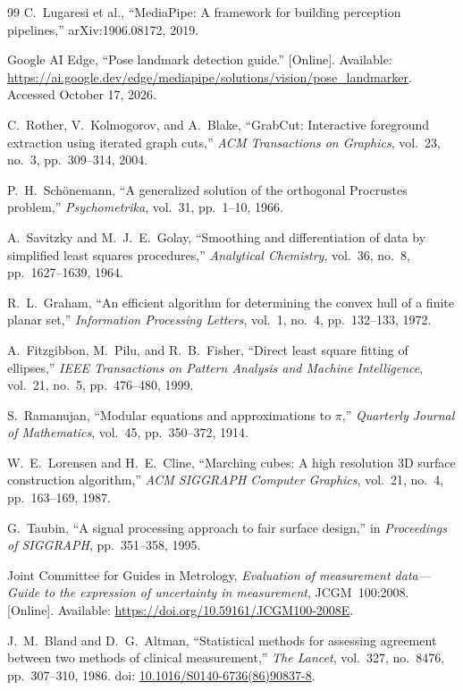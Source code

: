 \documentclass[11pt,a4paper]{article}
\numberwithin{equation}{section}
\begin{document}
\begin{thebibliography}{99}
C.~Lugaresi et al., ``MediaPipe: A framework for building perception pipelines,'' arXiv:1906.08172, 2019.

Google AI Edge, ``Pose landmark detection guide.'' [Online]. Available: \url{https://ai.google.dev/edge/mediapipe/solutions/vision/pose_landmarker}. Accessed October 17, 2026.

C.~Rother, V.~Kolmogorov, and A.~Blake, ``GrabCut: Interactive foreground extraction using iterated graph cuts,'' \emph{ACM Transactions on Graphics}, vol.~23, no.~3, pp.~309--314, 2004.

P.~H.~Sch\"onemann, ``A generalized solution of the orthogonal Procrustes problem,'' \emph{Psychometrika}, vol.~31, pp.~1--10, 1966.

A.~Savitzky and M.~J.~E.~Golay, ``Smoothing and differentiation of data by simplified least squares procedures,'' \emph{Analytical Chemistry}, vol.~36, no.~8, pp.~1627--1639, 1964.

R.~L.~Graham, ``An efficient algorithm for determining the convex hull of a finite planar set,'' \emph{Information Processing Letters}, vol.~1, no.~4, pp.~132--133, 1972.

A.~Fitzgibbon, M.~Pilu, and R.~B.~Fisher, ``Direct least square fitting of ellipses,'' \emph{IEEE Transactions on Pattern Analysis and Machine Intelligence}, vol.~21, no.~5, pp.~476--480, 1999.

S.~Ramanujan, ``Modular equations and approximations to $\pi$,'' \emph{Quarterly Journal of Mathematics}, vol.~45, pp.~350--372, 1914.

W.~E.~Lorensen and H.~E.~Cline, ``Marching cubes: A high resolution 3D surface construction algorithm,'' \emph{ACM SIGGRAPH Computer Graphics}, vol.~21, no.~4, pp.~163--169, 1987.

G.~Taubin, ``A signal processing approach to fair surface design,'' in \emph{Proceedings of SIGGRAPH}, pp.~351--358, 1995.

Joint Committee for Guides in Metrology, \emph{Evaluation of measurement data---Guide to the expression of uncertainty in measurement}, JCGM~100:2008. [Online]. Available: \url{https://doi.org/10.59161/JCGM100-2008E}.

J.~M.~Bland and D.~G.~Altman, ``Statistical methods for assessing agreement between two methods of clinical measurement,'' \emph{The Lancet}, vol.~327, no.~8476, pp.~307--310, 1986. doi: \href{https://doi.org/10.1016/S0140-6736(86)90837-8}{10.1016/S0140-6736(86)90837-8}.
\end{thebibliography}
\end{document}
